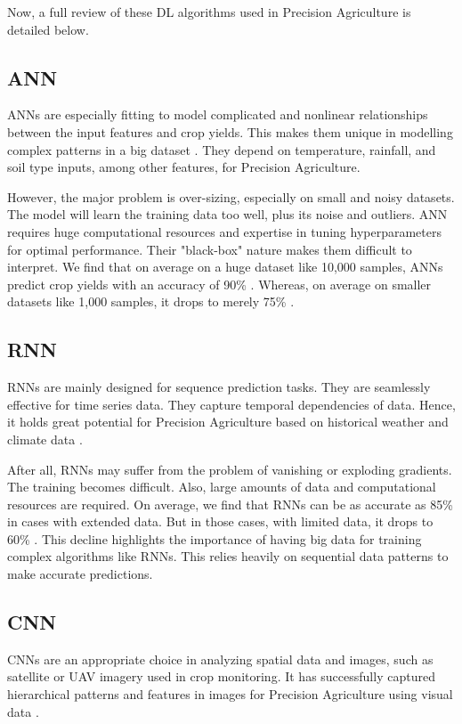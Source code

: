 \documentclass[conference]{IEEEtran}
\begin{document}
Now, a full review of these DL algorithms used in Precision Agriculture is detailed below.

\subsection{ANN}\label{AA}
ANNs are especially fitting to model complicated and nonlinear relationships between the input features and crop yields. This makes them unique in modelling complex patterns in a big dataset \cite{b33}. They depend on temperature, rainfall, and soil type inputs, among other features, for Precision Agriculture. 

However, the major problem is over-sizing, especially on small and noisy datasets. The model will learn the training data too well, plus its noise and outliers. ANN requires huge computational resources and expertise in tuning hyperparameters for optimal performance. Their "black-box" nature makes them difficult to interpret. We find that on average on a huge dataset like 10,000 samples, ANNs predict crop yields with an accuracy of 90\% \cite{b34}. Whereas, on average on smaller datasets like 1,000 samples, it drops to merely 75\% \cite{b35}.

\subsection{RNN}\label{AA}
RNNs are mainly designed for sequence prediction tasks. They are seamlessly effective for time series data. They capture temporal dependencies of data. Hence, it holds great potential for Precision Agriculture based on historical weather and climate data \cite{b36}. 

After all, RNNs may suffer from the problem of vanishing or exploding gradients. The training becomes difficult. Also, large amounts of data and computational resources are required. On average, we find that RNNs can be as accurate as 85\% in cases with extended data. But in those cases, with limited data, it drops to 60\% \cite{b37}. This decline highlights the importance of having big data for training complex algorithms like RNNs. This relies heavily on sequential data patterns to make accurate predictions.

\subsection{CNN}\label{AA}
CNNs are an appropriate choice in analyzing spatial data and images, such as satellite or UAV imagery used in crop monitoring. It has successfully captured hierarchical patterns and features in images for Precision Agriculture using visual data \cite{b38}.
\end{document}
